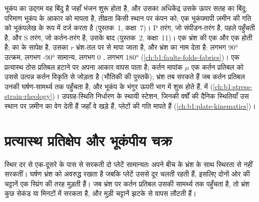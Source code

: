 \begin{recall}
भूकंप का उद्गम वह बिंदु है जहाँ भंजन शुरू होता है, और उसका अधिकेंद्र उसके ऊपर सतह का बिंदु; परिमाण भूकंप के आकार को मापता है, तीव्रता किसी स्थान पर कंपन को; एक भूकंपमापी ज़मीन की गति को भूकंपलेख के रूप में दर्ज करता है (पुस्तक~1, कक्षा~7)। P तरंग, जो संपीडन-तरंग है, पहले पहुँचती है, और S तरंग, जो कर्तन-तरंग है, उसके बाद (पुस्तक~2, कक्षा~11)। एक भ्रंश की एक  और एक  होती है;   का  के सापेक्ष  है, उसका  $r$ भ्रंश-तल पर  से मापा जाता है, और  भ्रंश का नाम देता है: लगभग \ang{90} उत्क्रम, लगभग \ang{-90} सामान्य, लगभग 0 , लगभग \ang{180}  (\cref{ch:b1:faults-folds-fabrics})। एक प्रत्यास्थ ठोस प्रतिबल हटाने पर अपना आकार वापस पाता है; कर्तन मापांक $\mu$ एक कर्तन प्रतिबल को उससे उत्पन्न कर्तन विकृति से जोड़ता है (भौतिकी की पुस्तकें); भ्रंश तब सरकते हैं जब कर्तन प्रतिबल उनकी घर्षण-सामर्थ्य तक पहुँचता है, और भूकंप  के भंगुर ऊपरी भाग में शुरू होते हैं,  में (\cref{ch:b1:stress-strain-rheology})। उपग्रह-स्थिति निर्धारण के स्थायी स्टेशन, जिनकी वर्षों की दैनिक स्थितियाँ उस स्थान पर ज़मीन का वेग देती हैं जहाँ वे खड़े हैं, प्लेटों की गति मापते हैं (\cref{ch:b1:plate-kinematics})।
\end{recall}

\section{प्रत्यास्थ प्रतिक्षेप और भूकंपीय चक्र}\label{sec:b1:earthquake-source:cycle}

स्थिर दर से एक-दूसरे के पास से सरकती दो प्लेटें सामान्यतः अपने बीच के भ्रंश के साथ स्थिरता से नहीं सरकतीं। घर्षण भ्रंश को अवरुद्ध रखता है जबकि प्लेटें उससे दूर चलती रहती हैं, इसलिए दोनों ओर की चट्टानें एक स्प्रिंग की तरह मुड़ती हैं। जब भ्रंश पर कर्तन प्रतिबल उसकी सामर्थ्य तक पहुँचता है, तो भ्रंश कुछ सेकंड या मिनटों में सरकता है, और मुड़ी चट्टानें झटके से वापस लौटती हैं।

